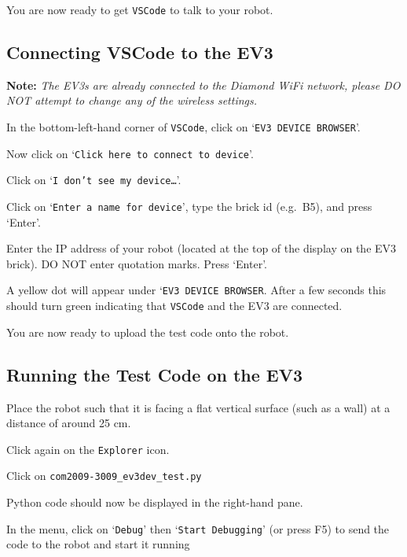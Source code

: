 \documentclass[hidelinks,a4paper,11pt]{article}
\begin{document}
You are now ready to get \texttt{VSCode} to talk to your robot.


\subsection{Connecting VSCode to the EV3}

{\bfseries Note:}  \emph{The EV3s are already connected to the Diamond WiFi network, please {\color {red} DO NOT} attempt to change any of the wireless settings.}

\begin{todolist}
	\item In the bottom-left-hand corner of \texttt{VSCode}, click on `\texttt{EV3 DEVICE BROWSER}'.
	\item Now click on `\texttt{Click here to connect to device}'.
	\item Click on `\texttt{I don't see my device\ldots}'.
	\item Click on `\texttt{Enter a name for device}', type the brick id (e.g.\ B5), and press `Enter'.
	\item Enter the IP address of your robot (located at the top of the display on the EV3 brick).  {\color {red} DO NOT} enter quotation marks.  Press `Enter'.
	\item A yellow dot will appear under `\texttt{EV3 DEVICE BROWSER}.  After a few seconds this should turn green indicating that \texttt{VSCode} and the EV3 are connected.
\end{todolist}

You are now ready to upload the test code onto the robot.


\subsection{Running the Test Code on the EV3}

\begin{todolist}
	\item Place the robot such that it is facing a flat vertical surface (such as a wall) at a distance of around 25 cm.
	\item Click again on the \texttt{Explorer} icon.
	\item Click on \texttt{com2009-3009\_ev3dev\_test.py}
	\item Python code should now be displayed in the right-hand pane.
	\item In the menu, click on `\texttt{Debug}' then `\texttt{Start Debugging}' (or press F5) to send the code to the robot and start it running
\end{todolist}
\end{document}
